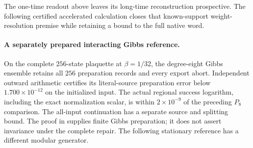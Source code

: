 {}
{}

The one-time readout above leaves its long-time reconstruction prospective.
The following certified accelerated calculation closes that known-support
weight-resolution premise while retaining a bound to the full native word.

{}
{}
{}
{}
{}
{}
\paragraph{A separately prepared interacting Gibbs reference.}
On the complete $256$-state plaquette at $\beta=1/32$, the degree-eight
Gibbs ensemble retains all $256$ preparation records and every export abort.
Independent outward arithmetic certifies its literal-source preparation
error below $1.700\times10^{-12}$ on the initialized input. The actual
regional success logarithm, including the exact normalization scalar,
is within $2\times10^{-9}$ of the preceding $P_8$ comparison.
The all-input continuation has a separate source and splitting bound.
The proof in  supplies finite
Gibbs preparation; it does not assert invariance under the complete repair.
The following stationary reference has a different modular generator.

